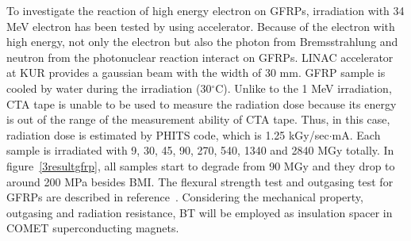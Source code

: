 To investigate the reaction of high energy electron on GFRPs, irradiation with 34 MeV electron has been tested by using accelerator.
Because of the electron with high energy, not only the electron but also the photon from Bremsstrahlung and neutron from the photonuclear reaction interact on GFRPs.
LINAC accelerator at KUR provides a gaussian beam with the width of 30 mm.
GFRP sample is cooled by water during the irradiation (30$^{\circ}$C).
Unlike to the 1 MeV irradiation, CTA tape is unable to be used to measure the radiation dose because its energy is out of the range of the measurement ability of CTA tape.
Thus, in this case, radiation dose is estimated by PHITS code, which is 1.25 kGy/sec$\cdot$mA.
Each sample is irradiated with 9, 30, 45, 90, 270, 540, 1340 and 2840 MGy totally.
In figure~\ref{3resultgfrp}, all samples start to degrade from 90 MGy and they drop to around 200 MPa besides BMI.
The flexural strength test and outgasing test for GFRPs are described in reference~\cite{takasaki}.
Considering the mechanical property, outgasing and radiation resistance, BT will be employed as insulation spacer in COMET superconducting magnets.

